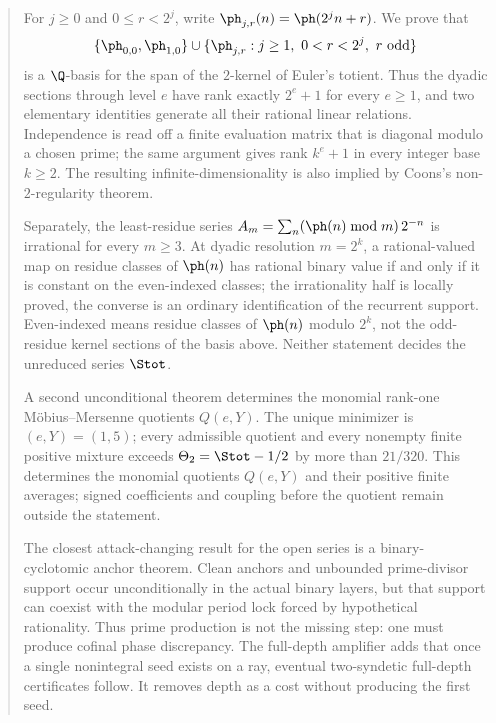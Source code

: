 \begin{abstract}
\noindent
For
$j\ge0$ and $0\le r<2^j$, write $\ph_{j,r}(n)=\ph(2^jn+r)$.  We prove that
\[
  \{\ph_{0,0},\ph_{1,0}\}
  \cup
  \{\ph_{j,r}:j\ge1,\ 0<r<2^j,\ r\ {\rm odd}\}
\]
is a $\Q$-basis for the span of the $2$-kernel of Euler's totient.  Thus the
dyadic sections through level $e$ have rank exactly $2^e+1$ for every $e\ge1$,
and two elementary identities generate all their rational linear relations.
Independence is read off a finite evaluation matrix that is diagonal modulo a chosen prime; the same argument gives rank $k^e+1$ in every integer base $k\ge2$.  The resulting infinite-dimensionality is also implied by Coons's non-$2$-regularity theorem.

Separately, the least-residue series $A_m=\sum_{n}(\ph(n)\bmod m)\,2^{-n}$
is irrational for every $m\ge3$.  At dyadic resolution $m=2^k$, a
rational-valued map on residue classes of $\ph(n)$ has rational binary value
if and only if it is constant on the even-indexed classes; the irrationality
half is locally proved, the converse is an ordinary identification of the
recurrent support.  Even-indexed means residue classes of $\ph(n)$ modulo
$2^k$, not the odd-residue kernel sections of the basis above.  Neither
statement decides the unreduced series $\Stot$.

A second unconditional theorem determines the monomial rank-one M\"obius--Mersenne quotients $Q(e,Y)$.  The unique minimizer is
$(e,Y)=(1,5)$; every admissible quotient and every nonempty finite positive
mixture exceeds $\Theta_2=\Stot-1/2$ by more than $21/320$.  This determines the monomial quotients $Q(e,Y)$ and their positive finite averages; signed coefficients and coupling before the quotient remain outside the statement.

The closest attack-changing result for the open series is a binary-cyclotomic
anchor theorem.  Clean anchors and unbounded prime-divisor support occur
unconditionally in the actual binary layers, but that support can coexist with
the modular period lock forced by hypothetical rationality.  Thus prime
production is not the missing step: one must produce cofinal phase
discrepancy.  The full-depth amplifier adds that once a single nonintegral seed
exists on a ray, eventual two-syndetic full-depth certificates follow.  It
removes depth as a cost without producing the first seed.


\end{abstract}
